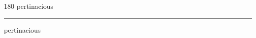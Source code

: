 
\begin{frame}
\begin{center}
\begin{turn}{180}
{\fontsize{2.5cm}{1em}\selectfont pertinacious}
\end{turn}
\vspace{1em}\par  
\hrule
\vspace{1em}\par  
{\fontsize{2.5cm}{1em}\selectfont pertinacious}
\end{center}
\end{frame}
